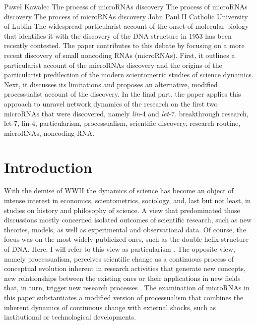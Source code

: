 \begin{artengenv}{Paweł Kawalec}
	{The process of microRNAs discovery}
	{The process of microRNAs discovery}
	{The process of microRNAs discovery}
	{John Paul II Catholic University of Lublin}
	{The widespread particularist account of the onset of molecular biology that identifies it with the discovery of the DNA structure in 1953 has been recently contested. The paper contributes to this debate by focusing on a more recent discovery of small noncoding RNAs (microRNAs). First, it outlines a particularist account of the microRNAs discovery and the origins of the particularist predilection of the modern scientometric studies of science dynamics. Next, it discusses its limitations and proposes an alternative, modified processualist account of the discovery. In the final part, the paper applies this approach to unravel network dynamics of the research on the first two microRNAs that were discovered, namely \textit{lin}-4 and \textit{let}-7.
	}
	{breakthrough research, let-7, lin-4, particularism, processualism, scientific discovery, research routine, microRNAs, noncoding RNA.}


\section{Introduction}
\lettrine[loversize=0.13,lines=2,lraise=-0.01,nindent=0em,findent=0.2pt]%
{W}{}ith the demise of WWII the dynamics of science has become an object of intense interest in economics, scientometrics, sociology, and, last but not least, in studies on history and philosophy of science. A view that predominated those discussions mostly concerned isolated outcomes of scientific research, such as new theories, models, as well as experimental and observational data. Of course, the focus was on the most widely publicized ones, such as the double helix structure of DNA. Here, I will refer to this view as particularism
\parencite[][]{giovagnoli_cognitive_2020}. %
 The opposite view, namely processualism, perceives scientific change as a continuous process of conceptual evolution inherent in research activities that generate new concepts, new relationships between the existing ones or their applications in new fields that, in turn, trigger new research processes 
\parencite[][]{nicholson_everything_2018}. %
 The examination of microRNAs in this paper substantiates a modified version of processualism that combines the inherent dynamics of continuous change with external shocks, such as institutional or technological developments.


\end{artengenv}
